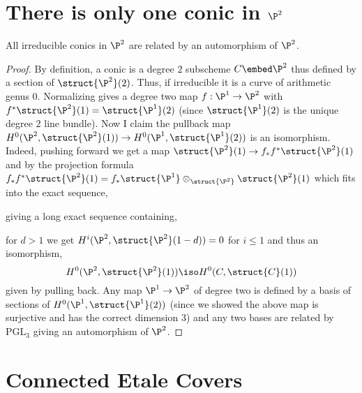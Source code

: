 \documentclass[12pt]{article}
\begin{document}
\section{There is only one conic in $\P^2$}

\begin{theorem}
All irreducible conics in $\P^2$ are related by an automorphism of $\P^2$.
\end{theorem}

\begin{proof}
By definition, a conic is a degree $2$ subscheme $C \embed \P^2$ thus defined by a section of $\struct{\P^2}(2)$. Thus, if irreducible it is a curve of arithmetic genus $0$. Normalizing gives a degree two map $f : \P^1 \to \P^2$ with $f^* \struct{\P^2}(1) = \struct{\P^1}(2)$ (since $\struct{\P^1}(2)$ is the unique degree $2$ line bundle). Now I claim the pullback map $H^0(\P^2, \struct{\P^2}(1)) \to H^0(\P^1, \struct{\P^1}(2))$ is an isomorphism. Indeed, pushing forward we get a map $\struct{\P^2}(1) \to f_* f^* \struct{\P^2}(1)$ and by the projection formula $f_* f^* \struct{\P^2}(1) = f_* \struct{\P^1} \otimes_{\struct{\P^2}} \struct{\P^2}(1)$ which fits into the exact sequence,
\begin{center}
\end{center}
giving a long exact sequence containing,
\begin{center}
\end{center}
for $d > 1$ we get $H^i(\P^2, \struct{\P^2}(1-d)) = 0$ for $i \le 1$ and thus an isomorphism,
\[ H^0(\P^2, \struct{\P^2}(1)) \iso H^0(C, \struct{C}(1)) \]
given by pulling back. Any map $\P^1 \to \P^2$ of degree two is defined by a basis of sections of $H^0(\P^1, \struct{\P^1}(2))$ (since we showed the above map is surjective and has the correct dimension $3$) and any two bases are related by $\mathrm{PGL}_3$ giving an automorphism of $\P^2$.
\end{proof}

\section{Connected Etale Covers}
\end{document}
